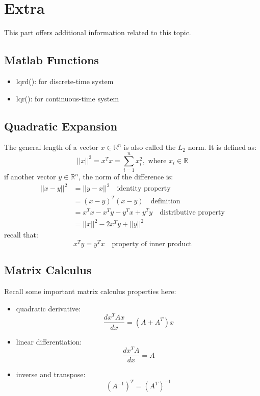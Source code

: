 \documentclass[10pt,a4paper,oneside]{article}
\begin{document}
\section{Extra}

This part offers additional information related to this topic.

\subsection{Matlab Functions}
\begin{itemize}
	\item lqrd(): for discrete-time system
	\item lqr(): for continuous-time system
\end{itemize}

\subsection{Quadratic Expansion}
The general length of a vector $x \in \mathbb{R}^n$ is also called the $L_2$ norm. It is defined as:
\[
||x||^2 = x^T x = \sum_{i=1}^{n} x_i ^2, \text{ where } x_i \in \mathbb{R} 
\]
if another vector $y \in \mathbb{R}^n$, the norm of the difference is:
\begin{align*}
||x-y||^2 &= ||y-x||^2 \quad \text{identity property}\\
& = (x-y)^T (x-y) \quad \text{definition}\\
& = x^Tx - x^Ty - y^Tx + y^Ty \quad \text{distributive property}\\
& = ||x||^2 -2x^Ty +||y||^2
\end{align*}
recall that:
\[
x^Ty = y^Tx \quad \text{property of inner product}
\]

\subsection{Matrix Calculus}
Recall some important matrix calculus properties here:
\begin{itemize}
	\item quadratic derivative:
	\[
	\frac{d x^T A x}{dx} = (A + A^T) x
	\]
	\item linear differentiation:
	\[
	\frac{d x^T A}{dx} = A
	\]
	\item inverse and transpose:
	\[
	(A^{-1})^T = (A^T)^{-1}
	\]
\end{itemize}
\end{document}
